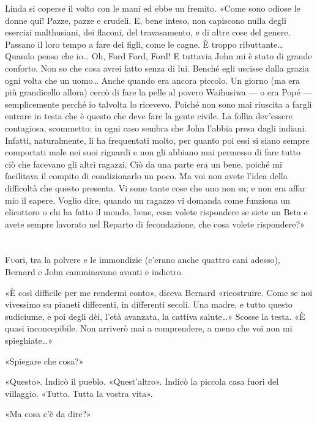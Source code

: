 \documentclass[
a5paper, %
10pt, %
twoside, 
onecolumn, %
openany, %
]{memoir}
\begin{document}
Linda si coperse il volto con le mani ed ebbe un fremito. «Come sono odiose le donne qui! Pazze, pazze e crudeli. E, bene inteso, non capiscono nulla degli esercizi malthusiani, dei flaconi, del travasamento, e di altre cose del genere. Passano il loro tempo a fare dei figli, come le cagne. È troppo ributtante… Quando penso che io… Oh, Ford Ford, Ford! E tuttavia John mi è stato di grande conforto. Non so che cosa avrei fatto senza di lui. Benché egli uscisse dalla grazia ogni volta che un uomo… Anche quando era ancora piccolo. Un giorno (ma era più grandicello allora) cercò di fare la pelle al povero Waihusiwa — o era Popé — semplicemente perché io talvolta lo ricevevo. Poiché non sono mai riuscita a fargli entrare in testa che è questo che deve fare la gente civile. La follia dev’essere contagiosa, scommetto: in ogni caso sembra che John l’abbia presa dagli indiani. Infatti, naturalmente, li ha frequentati molto, per quanto poi essi si siano sempre comportati male nei suoi riguardi e non gli abbiano mai permesso di fare tutto ciò che facevano gli altri ragazzi. Ciò da una parte era un bene, poiché mi facilitava il compito di condizionarlo un poco. Ma voi non avete l’idea della difficoltà che questo presenta. Vi sono tante cose che uno non sa; e non era affar mio il sapere. Voglio dire, quando un ragazzo vi domanda come funziona un elicottero o chi ha fatto il mondo, bene, cosa volete rispondere se siete un Beta e avete sempre lavorato nel Reparto di fecondazione, che cosa volete rispondere?»

\chapter{\phantom{text}}

\lettrine{F}uori, tra la polvere e le immondizie (c’erano anche quattro cani adesso), Bernard e John camminavano avanti e indietro.

«È così difficile per me rendermi conto», diceva Bernard «ricostruire. Come se noi vivessimo su pianeti differenti, in differenti secoli. Una madre, e tutto questo sudiciume, e poi degli dèi, l’età avanzata, la cattiva salute…» Scosse la testa. «È quasi inconcepibile. Non arriverò mai a comprendere, a meno che voi non mi spieghiate…»

«Spiegare che cosa?»

«Questo». Indicò il pueblo. «Quest’altro». Indicò la piccola casa fuori del villaggio. «Tutto. Tutta la vostra vita».

«Ma cosa c’è da dire?»
\end{document}
